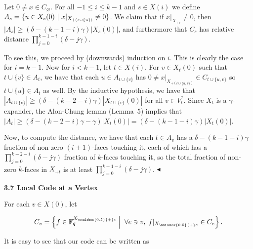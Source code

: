 \documentclass[10pt,a4paper]{article}
\begin{document}
Let $0\not=x\in C_{\varnothing}$. For all $-1\leq i\leq k-1$ and $s\in X(i)$ we define $A_{s}=\{u\in X_{s}(0)\nobreak\ |\nobreak\ x|_{X_{+(s\cup\{u\})}}\not=0\}$. We claim that if $x|_{X_{+s}}\not=0$, then $|A_{s}|\geq\left(\delta-(k-1-i)\gamma\right)|X_{s}(0)|$, and furthermore that $C_{s}$ has relative distance $\prod_{j=0}^{k-1-i}(\delta-j\gamma)$.\par




To see this, we proceed by (downwards) induction on $i$. This is clearly the case for $i=k-1$. Now for $i<k-1$, let $t\in X(i)$. For $v\in X_{t}(0)$ such that $t\cup\{v\}\in A_{t}$, we have that each $u\in A_{t\cup\{v\}}$ has $0\not=x|_{X_{+(t\cup\{u,v\})}}\in C_{t\cup\{u,v\}}$ so $t\cup\{u\}\in A_{t}$ as well. By the inductive hypothesis, we have that $|A_{t\cup\{v\}}|\geq(\delta-(k-2-i)\gamma)|X_{t\cup\{v\}}(0)|$ for all $v\in V^{*}_{t}$. Since $X_{t}$ is a $\gamma$-expander, the Alon-Chung lemma (Lemma 5) implies that $|A_{t}|\geq(\delta-(k-2-i)\gamma-\gamma)|X_{t}(0)|=(\delta-(k-1-i)\gamma)|X_{t}(0)|$.\par




Now, to compute the distance, we have that each $t\in A_{v}$ has a $\delta-(k-1-i)\gamma$ fraction of non-zero $(i+1)$-faces touching it, each of which has a $\prod_{j=0}^{k-2-i}(\delta-j\gamma)$ fraction of $k$-faces touching it, so the total fraction of non-zero $k$-faces in $X_{+t}$ is at least $\prod_{j=0}^{k-1-i}(\delta-j\gamma)$.
$\blacktriangleleft$\par






\par\medskip\noindent\textbf{
3.7 Local Code at a Vertex}\par




For each $v\in X(0)$, let\par


\[\begin{gathered}
C_{v}=\left\{f\in\mathbb{F}_{q}^{{X}_{\scalebox{0.5}{+}v}}\left|\;\vphantom{f\in\mathbb{F}_{q}^{{X}_{\scalebox{0.5}{+}v}}\forall e\ni v,\;f|_{{X}_{\scalebox{0.5}{+}e}}\in C_{e}}\right.\forall e\ni v,\;f|_{{X}_{\scalebox{0.5}{+}e}}\in C_{e}\right\}.
\end{gathered}\]


It is easy to see that our code can be written as\par
\end{document}
